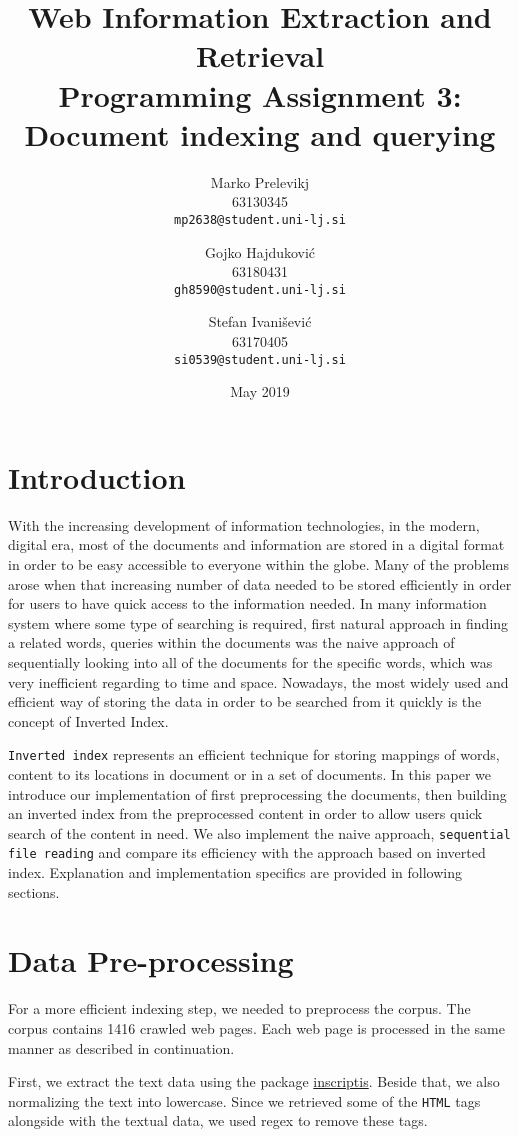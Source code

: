 \documentclass{article}
\title{
	Web Information Extraction and Retrieval\\
	Programming Assignment 3: \\
	Document indexing and querying
}
\author{
	Marko Prelevikj\\
	63130345\\
	\texttt{mp2638@student.uni-lj.si}
	\and
	Gojko Hajduković\\
	63180431\\
	\texttt{gh8590@student.uni-lj.si}
	\and
	Stefan Ivanišević\\
	63170405\\
	\texttt{si0539@student.uni-lj.si}
}
\date{May 2019}
\begin{document}
\maketitle
\section{Introduction}
With the increasing development of information technologies, in the modern, digital era, most of the documents and information are stored in a digital format in order to be easy accessible to everyone within the globe. Many of the problems arose when that increasing number of data needed to be stored efficiently in order for users to have quick access to the information needed. In many information system where some type of searching is required, first natural approach in finding a related words, queries within the documents was the naive approach of sequentially looking into all of the documents for the specific words, which was very inefficient regarding to time and space. Nowadays, the most widely used and efficient way of storing the data in order to be searched from it quickly is the concept of Inverted Index.

\texttt{Inverted index} represents an efficient technique for storing mappings of words, content to its locations in document or in a set of documents. In this paper we introduce our implementation of first preprocessing the documents, then building an inverted index from the preprocessed content in order to allow users quick search of the content in need. We also implement the naive approach, \texttt{sequential file reading} and compare its efficiency with the approach based on inverted index. Explanation and implementation specifics are provided in following sections.

\section{Data Pre-processing} \label{sec:Preprocess}
For a more efficient indexing step, we needed to preprocess the corpus. The corpus contains 1416 crawled web pages. Each web page is processed in the same manner as described in continuation.

First, we extract the text data using the package \href{https://pypi.org/project/inscriptis/}{inscriptis}. Beside that, we also normalizing the text into lowercase. Since we retrieved some of the \texttt{HTML} tags alongside with the textual data, we used regex to remove these tags.
\end{document}
